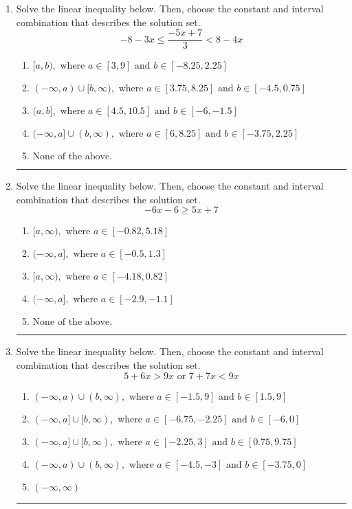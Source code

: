 \documentclass[14pt]{extbook}
\newcommand{\litem}[1]{\item#1\hspace*{-1cm}\rule{\textwidth}{0.4pt}}
\begin{document}
\begin{enumerate}
{\begin{enumerate}[label=\Alph*.]
\end{enumerate} }
\litem{
Solve the linear inequality below. Then, choose the constant and interval combination that describes the solution set.\[ -8 - 3 x \leq \frac{-5 x + 7}{3} < 8 - 4 x \]\begin{enumerate}[label=\Alph*.]
\item \( [a, b), \text{ where } a \in [3, 9] \text{ and } b \in [-8.25, 2.25] \)
\item \( (-\infty, a) \cup [b, \infty), \text{ where } a \in [3.75, 8.25] \text{ and } b \in [-4.5, 0.75] \)
\item \( (a, b], \text{ where } a \in [4.5, 10.5] \text{ and } b \in [-6, -1.5] \)
\item \( (-\infty, a] \cup (b, \infty), \text{ where } a \in [6, 8.25] \text{ and } b \in [-3.75, 2.25] \)
\item \( \text{None of the above.} \)

\end{enumerate} }
\litem{
Solve the linear inequality below. Then, choose the constant and interval combination that describes the solution set.\[ -6x -6 \geq 5x + 7 \]\begin{enumerate}[label=\Alph*.]
\item \( [a, \infty), \text{ where } a \in [-0.82, 5.18] \)
\item \( (-\infty, a], \text{ where } a \in [-0.5, 1.3] \)
\item \( [a, \infty), \text{ where } a \in [-4.18, 0.82] \)
\item \( (-\infty, a], \text{ where } a \in [-2.9, -1.1] \)
\item \( \text{None of the above}. \)

\end{enumerate} }
\litem{
Solve the linear inequality below. Then, choose the constant and interval combination that describes the solution set.\[ 5 + 6 x > 9 x \text{ or } 7 + 7 x < 9 x \]\begin{enumerate}[label=\Alph*.]
\item \( (-\infty, a) \cup (b, \infty), \text{ where } a \in [-1.5, 9] \text{ and } b \in [1.5, 9] \)
\item \( (-\infty, a] \cup [b, \infty), \text{ where } a \in [-6.75, -2.25] \text{ and } b \in [-6, 0] \)
\item \( (-\infty, a] \cup [b, \infty), \text{ where } a \in [-2.25, 3] \text{ and } b \in [0.75, 9.75] \)
\item \( (-\infty, a) \cup (b, \infty), \text{ where } a \in [-4.5, -3] \text{ and } b \in [-3.75, 0] \)
\item \( (-\infty, \infty) \)

\end{enumerate} }
\end{enumerate}
\end{document}
